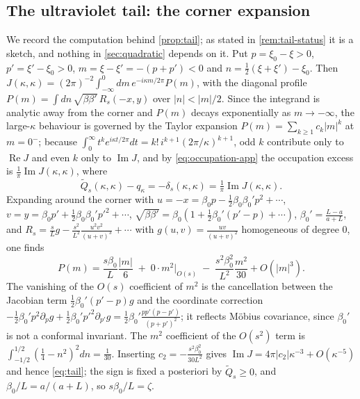 \subsection{The ultraviolet tail: the corner expansion}
\label{app:tail}
We record the computation behind \cref{prop:tail}; as stated in
\cref{rem:tail-status} it is a sketch, and nothing in \cref{sec:quadratic} depends
on it.  Put $p=\xi_0-\xi>0$, $p'=\xi'-\xi_0>0$, $m=\xi-\xi'=-(p+p')<0$ and
$n=\frac12(\xi+\xi')-\xi_0$.  Then
$J(\kappa,\kappa)=(2\pi)^{-2}\int_{-\infty}^0dm\,e^{-i\kappa m/2\pi}P(m)$, with the
diagonal profile $P(m)=\int dn\,\sqrt{\beta\beta'}\,R_s(-x,y)$ over
$|n|<|m|/2$.  Since the integrand is analytic away from the corner and $P(m)$
decays exponentially as $m\to-\infty$, the large-$\kappa$ behaviour is governed by
the Taylor expansion $P(m)=\sum_{k\ge1}c_k|m|^k$ at $m=0^-$; because
$\int_0^\infty t^ke^{i\kappa t/2\pi}dt=k!\,i^{k+1}(2\pi/\kappa)^{k+1}$, odd $k$
contribute only to $\operatorname{Re}J$ and even $k$ only to $\operatorname{Im}J$,
and by \eqref{eq:occupation-app} the occupation excess is
$\frac1\pi\operatorname{Im}J(\kappa,\kappa)$, where
\begin{equation}\label{eq:occupation-app}
 \widetilde Q_s(\kappa,\kappa)-q_\kappa=-\delta_s(\kappa,\kappa)
 =\tfrac1\pi\operatorname{Im}J(\kappa,\kappa).
\end{equation}
Expanding around the corner with $u=-x=\beta_0p-\frac12\beta_0\beta_0'p^2+\cdots$,
$v=y=\beta_0p'+\frac12\beta_0\beta_0'p'^2+\cdots$,
$\sqrt{\beta\beta'}=\beta_0(1+\frac12\beta_0'(p'-p)+\cdots)$,
$\beta_0'=\frac{L-a}{a+L}$, and
$R_s=\frac sLg-\frac{s^2}{L^2}\frac{u^2v^2}{(u+v)^3}+\cdots$ with
$g(u,v)=\frac{uv}{(u+v)^2}$ homogeneous of degree $0$, one finds
\begin{equation}\label{eq:Pm}
 P(m)=\frac{s\beta_0}L\frac{|m|}6
 \;+\;0\cdot m^2\Big|_{O(s)}
 \;-\;\frac{s^2\beta_0^2}{L^2}\frac{m^2}{30}+O(|m|^3).
\end{equation}
The vanishing of the $O(s)$ coefficient of $m^2$ is the cancellation between the
Jacobian term $\frac12\beta_0'(p'-p)g$ and the coordinate correction
$-\frac12\beta_0'p^2\partial_pg+\frac12\beta_0'p'^2\partial_{p'}g
=\frac12\beta_0'\frac{pp'(p-p')}{(p+p')^2}$; it reflects M\"obius covariance, since
$\beta_0'$ is not a conformal invariant.  The $m^2$ coefficient of the $O(s^2)$
term is $\int_{-1/2}^{1/2}(\frac14-n^2)^2dn=\frac1{30}$.  Inserting
$c_2=-\frac{s^2\beta_0^2}{30L^2}$ gives
$\operatorname{Im}J=4\pi|c_2|\kappa^{-3}+O(\kappa^{-5})$ and hence \eqref{eq:tail};
the sign is fixed a posteriori by $\widetilde Q_s\ge0$, and
$\beta_0/L=a/(a+L)$, so $s\beta_0/L=\zeta$.

